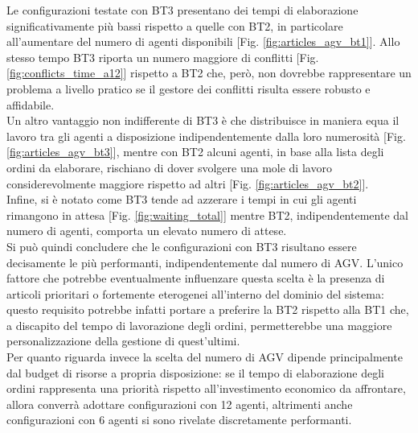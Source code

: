 \documentclass[12pt]{article}
\begin{document}
\noindent Le configurazioni testate con BT3 presentano dei tempi di elaborazione significativamente più bassi rispetto a quelle con BT2, in particolare all'aumentare del numero di agenti disponibili [Fig. \ref{fig:articles_agv_bt1}]. Allo stesso tempo BT3 riporta un numero maggiore di conflitti [Fig. \ref{fig:conflicts_time_a12}] rispetto a BT2 che, però, non dovrebbe rappresentare un problema a livello pratico se il gestore dei conflitti risulta essere robusto e affidabile. \\
Un altro vantaggio non indifferente di BT3 è che distribuisce in maniera equa il lavoro tra gli agenti a disposizione indipendentemente dalla loro numerosità [Fig. \ref{fig:articles_agv_bt3}], mentre con BT2 alcuni agenti, in base alla lista degli ordini da elaborare, rischiano di dover svolgere una mole di lavoro considerevolmente maggiore rispetto ad altri [Fig. \ref{fig:articles_agv_bt2}]. \\
\noindent Infine, si è notato come BT3 tende ad azzerare i tempi in cui gli agenti rimangono in attesa [Fig. \ref{fig:waiting_total}] mentre BT2, indipendentemente dal numero di agenti, comporta un elevato numero di attese.\\

\noindent Si può quindi concludere che le configurazioni con BT3 risultano essere decisamente le più performanti, indipendentemente dal numero di AGV. L'unico fattore che potrebbe eventualmente influenzare questa scelta è la presenza di articoli prioritari o fortemente eterogenei all'interno del dominio del sistema: questo requisito potrebbe infatti portare a preferire la BT2 rispetto alla BT1 che, a discapito del tempo di lavorazione degli ordini, permetterebbe una maggiore personalizzazione della gestione di quest'ultimi.\\

\noindent Per quanto riguarda invece la scelta del numero di AGV dipende principalmente dal budget di risorse a propria disposizione: se il tempo di elaborazione degli ordini rappresenta una priorità rispetto all'investimento economico da affrontare, allora converrà adottare configurazioni con 12 agenti, altrimenti anche configurazioni con 6 agenti si sono rivelate discretamente performanti.

\newpage
\end{document}
